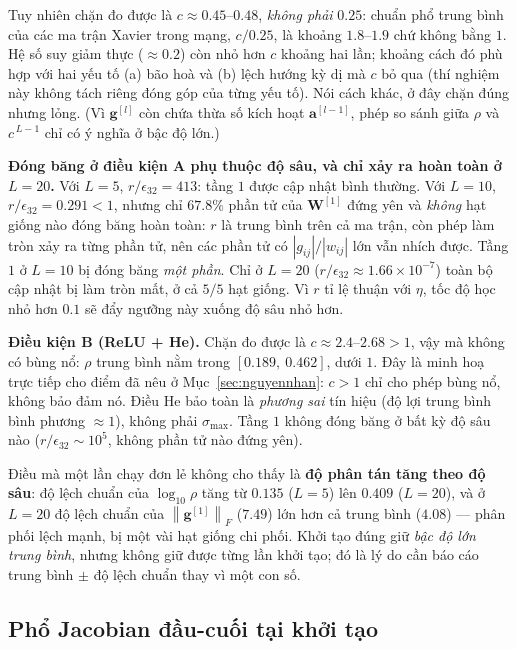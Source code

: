 Tuy nhiên chặn đo được là $c \approx 0.45$--$0.48$, \emph{không phải} $0.25$:
chuẩn phổ trung bình của các ma trận Xavier trong mạng, $c/0.25$, là khoảng
$1.8$--$1.9$ chứ không bằng $1$.
Hệ số suy giảm thực ($\approx0.2$) còn nhỏ hơn $c$ khoảng hai lần; khoảng cách
đó phù hợp với hai yếu tố (a) bão hoà và (b) lệch hướng kỳ dị mà $c$ bỏ qua (thí nghiệm này không
tách riêng đóng góp của từng yếu tố). Nói
cách khác, ở đây chặn đúng nhưng lỏng. (Vì
$\mathbf{g}^{[l]}$ còn chứa thừa số kích hoạt $\mathbf{a}^{[l-1]}$, phép so sánh
giữa $\rho$ và $c^{\,L-1}$ chỉ có ý nghĩa ở bậc độ lớn.)

\textbf{Đóng băng ở điều kiện A phụ thuộc độ sâu, và chỉ xảy ra hoàn toàn ở
$L=20$.} Với $L=5$, $r/\epsilon_{32} = 413$: tầng $1$ được cập nhật bình thường.
Với $L=10$, $r/\epsilon_{32} = 0.291 < 1$, nhưng chỉ $67.8\%$ phần tử của
$\mathbf{W}^{[1]}$ đứng yên và \emph{không} hạt giống nào đóng băng hoàn toàn:
$r$ là trung bình trên cả ma trận, còn phép làm tròn xảy ra từng phần tử, nên các
phần tử có $|g_{ij}|/|w_{ij}|$ lớn vẫn nhích được. Tầng $1$ ở $L=10$ bị đóng
băng \emph{một phần}. Chỉ ở $L=20$ ($r/\epsilon_{32}\approx1.66\times10^{-7}$)
toàn bộ cập nhật bị làm tròn mất, ở cả $5/5$ hạt giống. Vì $r$ tỉ lệ thuận với
$\eta$, tốc độ học nhỏ hơn $0.1$ sẽ đẩy ngưỡng này xuống độ sâu nhỏ hơn.

\textbf{Điều kiện B (ReLU + He).} Chặn đo được là $c \approx 2.4$--$2.68 > 1$,
vậy mà không có bùng nổ: $\rho$ trung bình nằm trong $[0.189,\ 0.462]$, dưới
$1$. Đây là minh hoạ trực tiếp cho điểm đã nêu ở Mục~\ref{sec:nguyennhan}:
$c>1$ chỉ cho phép bùng nổ, không bảo đảm nó. Điều He bảo toàn là
\emph{phương sai} tín hiệu (độ lợi trung bình bình phương $\approx1$), không
phải $\sigma_{\max}$. Tầng $1$ không đóng băng ở bất kỳ độ sâu nào
($r/\epsilon_{32}\sim10^{5}$, không phần tử nào đứng yên).

Điều mà một lần chạy đơn lẻ không cho thấy là \textbf{độ phân tán tăng theo độ
sâu}: độ lệch chuẩn của $\log_{10}\rho$ tăng từ $0.135$ ($L=5$) lên $0.409$
($L=20$), và ở $L=20$ độ lệch chuẩn của $\left\|\mathbf{g}^{[1]}\right\|_F$
($7.49$) lớn hơn cả trung bình ($4.08$) --- phân phối lệch mạnh, bị một vài hạt
giống chi phối. Khởi tạo đúng giữ \emph{bậc độ lớn trung bình}, nhưng không giữ
được từng lần khởi tạo; đó là lý do cần báo cáo trung bình $\pm$ độ lệch chuẩn
thay vì một con số.

\subsection{Phổ Jacobian đầu-cuối tại khởi tạo}
\label{subsec:jacobian-exp}

